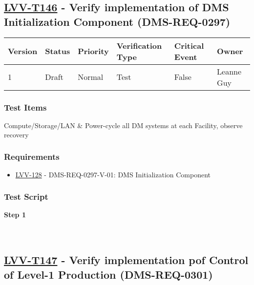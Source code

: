 \hypertarget{lvv-t146---verify-implementation-of-dms-initialization-component-dms-req-0297}{%
\subsection{\texorpdfstring{\href{https://jira.lsstcorp.org/secure/Tests.jspa\#/testCase/LVV-T146}{LVV-T146}
- Verify implementation of DMS Initialization Component
(DMS-REQ-0297)}{LVV-T146 - Verify implementation of DMS Initialization Component (DMS-REQ-0297)}}\label{lvv-t146---verify-implementation-of-dms-initialization-component-dms-req-0297}}

\begin{longtable}[]{@{}llllll@{}}
\toprule
Version & Status & Priority & Verification Type & Critical Event &
Owner\tabularnewline
\midrule
\endhead
1 & Draft & Normal & Test & False & Leanne Guy\tabularnewline
\bottomrule
\end{longtable}

\hypertarget{test-items-122}{%
\subsubsection{Test Items}\label{test-items-122}}

Compute/Storage/LAN \& Power-cycle all DM systems at each Facility,
observe recovery

\hypertarget{requirements-123}{%
\subsubsection{Requirements}\label{requirements-123}}

\begin{itemize}
\tightlist
\item
  \href{https://jira.lsstcorp.org/browse/LVV-128}{LVV-128} -
  DMS-REQ-0297-V-01: DMS Initialization Component
\end{itemize}

\hypertarget{test-script-123}{%
\subsubsection{Test Script}\label{test-script-123}}

\textbf{Step 1}\\
~\\
~\\

\hypertarget{lvv-t147---verify-implementation-pof-control-of-level-1-production-dms-req-0301}{%
\subsection{\texorpdfstring{\href{https://jira.lsstcorp.org/secure/Tests.jspa\#/testCase/LVV-T147}{LVV-T147}
- Verify implementation pof Control of Level-1 Production
(DMS-REQ-0301)}{LVV-T147 - Verify implementation pof Control of Level-1 Production (DMS-REQ-0301)}}\label{lvv-t147---verify-implementation-pof-control-of-level-1-production-dms-req-0301}}

